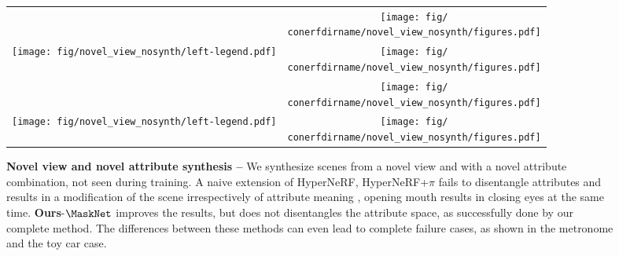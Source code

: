 \begin{figure*}
  \centering
  \setlength\tabcolsep{0pt}
  \renewcommand{\arraystretch}{0}
  \begin{tabular}{lc}
                                                                                                                               &
    \texttt{[image: fig/\\conerfdirname/novel\_view\_nosynth/figures.pdf]}           \\
    \multirow[t]{-2}{*}{\texttt{[image: fig/novel\_view\_nosynth/left-legend.pdf]}} &
    \texttt{[image: fig/\\conerfdirname/novel\_view\_nosynth/figures.pdf]}           \\
                                                                                                                               &
    \texttt{[image: fig/\\conerfdirname/novel\_view\_nosynth/figures.pdf]}           \\
    \multirow[t]{-2}{*}{\texttt{[image: fig/novel\_view\_nosynth/left-legend.pdf]}} &
    \texttt{[image: fig/\\conerfdirname/novel\_view\_nosynth/figures.pdf]}
  \end{tabular}
  \renewcommand{\arraystretch}{1}
  \caption{{\bf Novel view and novel attribute synthesis --}
    We synthesize scenes from a novel view and with a novel attribute
    combination, not seen during training.
    A naive extension of HyperNeRF, HyperNeRF{+}$\pi$ fails to disentangle
    attributes and results in a modification of the scene irrespectively of
    attribute meaning \eg, opening mouth results in closing eyes at the same
    time.
    \textbf{Ours}-$\MaskNet$ improves the results, but does not disentangles the attribute space, as successfully done by our complete method. %
    The differences between these methods can even lead to complete failure
    cases, as shown in the metronome and the toy car case.
  }
  \label{fig:conerf-novel_view}
\end{figure*}